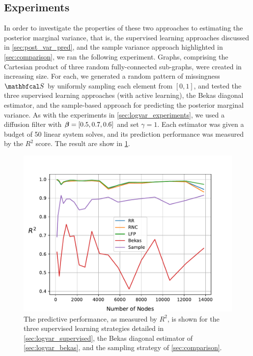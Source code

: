 \subsection{Experiments}

In order to investigate the properties of these two approaches to estimating the posterior marginal variance, that is, the supervised learning approaches discussed in \cref{sec:post_var_pred}, and the sample variance approach highlighted in \cref{sec:comparison}, we ran the following experiment. Graphs, comprising the Cartesian product of three random fully-connected sub-graphs, were created in increasing size. For each, we generated a random pattern of missingness $\St$ by uniformly sampling each element from $[0, 1]$, and tested the three supervised learning approaches (with active learning), the Bekas diagonal estimator, and the sample-based approach for predicting the posterior marginal variance. As with the experiments in \cref{sec:logvar_experiments}, we used a diffusion filter with $\boldsymbol{\beta} = [0.5, 0.7, 0.6]$ and set $\gamma=1$. Each estimator was given a budget of 50 linear system solves, and its prediction performance was measured by the $R^2$ score. The result are show in \cref{fig:var_comparison}.


\begin{figure}[t] 
    \begin{center}
        \includegraphics[width=0.8\linewidth]{Figures/sample_diag_estimation.pdf}
    \end{center}
   \caption[Performance of the sampling strategy for predicting posterior marginal variance compared with the supervised learning strategies as a function of graph size]{The predictive performance, as measured by $R^2$, is shown for the three supervised learning strategies detailed in \cref{sec:logvar_supervised}, the Bekas diagonal estimator of \cref{sec:logvar_bekas}, and the sampling strategy of \cref{sec:comparison}. } 
    \label{fig:var_comparison}
\end{figure} 


